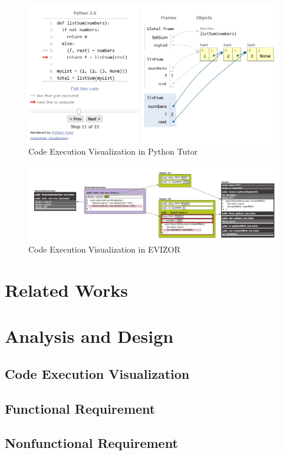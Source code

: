 \documentclass[conference]{IEEEtran}
\begin{document}
\begin{figure}[htbp]
  \centerline{\includegraphics[width=\linewidth]{chapter2/pythontutor.png}}
  \caption{Code Execution Visualization in Python Tutor} \label{fig:pythontutor}
\end{figure}

\begin{figure}[htbp]
  \centerline{\includegraphics[width=\linewidth]{chapter2/evizor.png}}
  \caption{Code Execution Visualization in EVIZOR} \label{fig:evizor}
\end{figure}

\section{Related Works}

\section{Analysis and Design}
\subsection{Code Execution Visualization}
\subsection{Functional Requirement}
\subsection{Nonfunctional Requirement}
\end{document}
